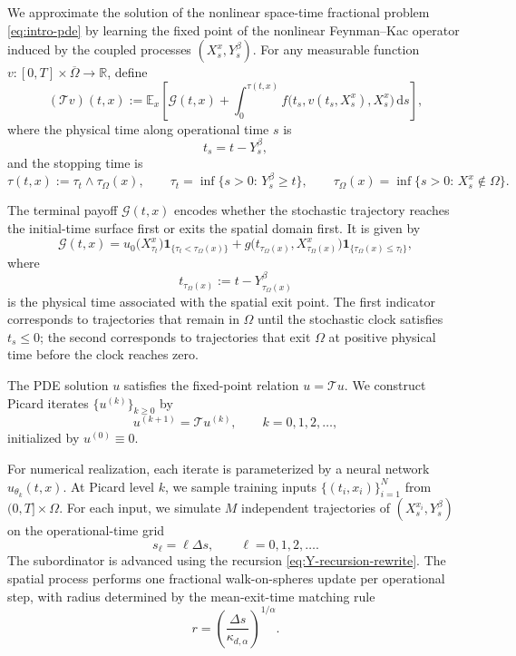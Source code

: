 \documentclass[a4paper,fleqn]{cas-sc}
\newcommand{\rd}{\mathrm{d}}
\begin{document}
We approximate the solution of the nonlinear space-time fractional problem
\eqref{eq:intro-pde} by learning the fixed point of the nonlinear
Feynman--Kac operator induced by the coupled processes $(X_s^x,Y_s^\beta)$.
For any measurable function $v:[0,T]\times\overline{\Omega}\to\mathbb{R}$,
define
\begin{equation}\label{eq:T-operator-dpi}
(\mathcal{T}v)(t,x)
:=
\mathbb{E}_x\!\left[
\mathcal{G}(t,x)
+
\int_{0}^{\tau(t,x)}
f\!\bigl(t_s, v(t_s, X_s^x), X_s^x\bigr)\,\rd s
\right],
\end{equation}
where the physical time along operational time $s$ is
\[
t_s=t-Y_s^\beta,
\]
and the stopping time is
\[
\tau(t,x):=\tau_t\wedge\tau_\Omega(x),
\qquad
\tau_t=\inf\{s>0:\,Y_s^\beta\ge t\},
\qquad
\tau_\Omega(x)=\inf\{s>0:\,X_s^x\notin\Omega\}.
\]

The terminal payoff $\mathcal{G}(t,x)$ encodes whether the stochastic trajectory
reaches the initial-time surface first or exits the spatial domain first. It is
given by
\begin{equation}\label{eq:terminal-payoff}
\mathcal{G}(t,x)
=
u_0\!\bigl(X_{\tau_t}^x\bigr)
\mathbf{1}_{\{\tau_t<\tau_\Omega(x)\}}
+
g\!\bigl(t_{\tau_\Omega(x)},X_{\tau_\Omega(x)}^x\bigr)
\mathbf{1}_{\{\tau_\Omega(x)\le\tau_t\}},
\end{equation}
where
\[
t_{\tau_\Omega(x)}:=t-Y_{\tau_\Omega(x)}^\beta
\]
is the physical time associated with the spatial exit point. The first
indicator corresponds to trajectories that remain in $\Omega$ until the
stochastic clock satisfies $t_s\le0$; the second corresponds to trajectories
that exit $\Omega$ at positive physical time before the clock reaches zero.

The PDE solution $u$ satisfies the fixed-point relation $u=\mathcal{T}u$. We
construct Picard iterates $\{u^{(k)}\}_{k\ge0}$ by
\begin{equation}\label{eq:picard-functional-dpi}
u^{(k+1)}=\mathcal{T}u^{(k)},
\qquad k=0,1,2,\ldots,
\end{equation}
initialized by $u^{(0)}\equiv0$.

For numerical realization, each iterate is parameterized by a neural network
$u_{\theta_k}(t,x)$. At Picard level $k$, we sample training inputs
$\{(t_i,x_i)\}_{i=1}^N$ from $(0,T]\times\Omega$. For each input, we simulate
$M$ independent trajectories of $(X_s^{x_i},Y_s^\beta)$ on the operational-time
grid
\[
s_\ell=\ell\Delta s,\qquad \ell=0,1,2,\ldots .
\]
The subordinator is advanced using the recursion
\eqref{eq:Y-recursion-rewrite}. The spatial process performs one fractional
walk-on-spheres update per operational step, with radius determined by the
mean-exit-time matching rule
\[
r
=
\left(
\frac{\Delta s}{\kappa_{d,\alpha}}
\right)^{1/\alpha}.
\]
\end{document}
